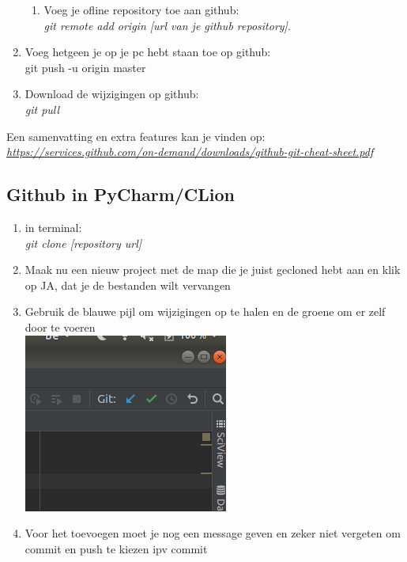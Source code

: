 \documentclass[a4paper, titlepage]{article}
\begin{document}
\begin{enumerate}
\begin{enumerate}
					\item Voeg je ofline repository toe aan github:\\ \textit{git remote add origin [url van je github repository]}.
				\end{enumerate}
				
				\item Voeg hetgeen je op je pc hebt staan toe op github:\\ git push -u origin master
				
				\item Download de wijzigingen op github:\\ \textit{git pull}
			\end{enumerate}
			
			Een samenvatting en extra features kan je vinden op:\\ \href{https://services.github.com/on-demand/downloads/github-git-cheat-sheet.pdf}{\textit{https://services.github.com/on-demand/downloads/github-git-cheat-sheet.pdf}}
		
		\subsection{Github in PyCharm/CLion}
		\begin{enumerate}
			\item in terminal:\\ \textit{git clone [repository url]}
			\item Maak nu een nieuw project met de map die je juist gecloned hebt aan en klik op JA, dat je de bestanden wilt vervangen
			
			\item Gebruik de blauwe pijl om wijzigingen op te halen en de groene om er zelf door te voeren\\ \includegraphics[scale=0.3]{img/pushpull}
			
			\item Voor het toevoegen moet je nog een message geven en zeker niet vergeten om commit en push te kiezen ipv commit
		\end{enumerate}
		
\end{document}
